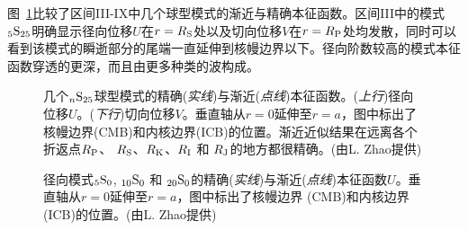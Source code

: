 图~\ref{12.fig.UVcomp}比较了区间III-IX中几个球型模式的渐近与精确本征函数。区间III中的模式${}_5{\rm S}_{25}$明确显示径向位移$U$在$r=R_{\rm S}$处以及切向位移$V$在$r=R_{\rm P}$处均发散，同时可以看到该模式的瞬逝部分的尾端一直延伸到核幔边界以下。径向阶数较高的模式本征函数穿透的更深，而且由更多种类的波构成。
\begin{figure}[!t]
\begin{center}
\end{center}
\caption[U,V Comparison]{\label{12.fig.UVcomp}
几个${}_n{\rm S}_{25}$球型模式的精确({\em 实线\/})与渐近({\em 点线\/})本征函数。({\em 上行\/})径向位移$U$。({\em 下行\/})切向位移$V$。垂直轴从$r=0$延伸至$r=a$，图中标出了核幔边界(CMB)和内核边界(ICB)的位置。渐近近似结果在远离各个折返点$R_{\rm P}$、
$R_{\rm S}$、$R_{\rm K}$、$R_{\rm I}$ 和 $R_{\rm J}$的地方都很精确。(由L. Zhao提供)
}
\end{figure}
\begin{figure}[!b]
\begin{center}
\end{center}
\caption[U Rad Comparison]{\label{12.fig.Uradcom}
径向模式${}_5{\rm S}_0$,
${}_{10}{\rm S}_0$ 和 ${}_{20}{\rm S}_0$的精确({\em 实线\/})与渐近({\em 点线\/})本征函数$U$。垂直轴从$r=0$延伸至$r=a$，图中标出了核幔边界 (CMB)和内核边界(ICB)的位置。(由L. Zhao提供)
}
\end{figure}
